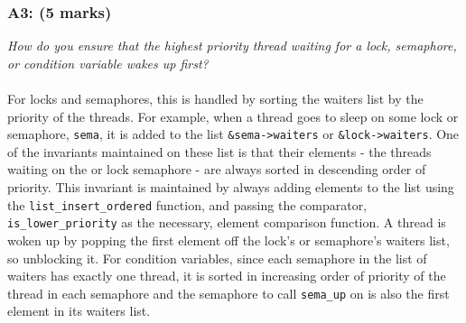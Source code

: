 \documentclass{article}
\begin{document}
\subsubsection*{A3: (5 marks) }
\textit{How do you ensure that the highest priority thread waiting for a lock, semaphore, or condition variable wakes up first?}
\\ \\
For locks and semaphores, this is handled by sorting the waiters list by the priority of the threads. For example, when a thread goes to sleep on some lock or semaphore, \texttt{sema}, it is added to the list \texttt{\&sema->waiters} or \texttt{\&lock->waiters}. One of the invariants maintained on these list is that their elements - the threads waiting on the or lock semaphore - are always sorted in descending order of priority. This invariant is maintained by always adding elements to the list using the \texttt{list\_insert\_ordered} function, and passing the comparator, \texttt{is\_lower\_priority} as the necessary, element comparison function. A thread is woken up by popping the first element off the lock's or semaphore's waiters list, so unblocking it. For condition variables, since each semaphore in the list of waiters has exactly one thread, it is sorted in increasing order of priority of the thread in each semaphore and the semaphore to call \texttt{sema\_up} on is also the first element in its waiters list.
\\ \\
\end{document}
